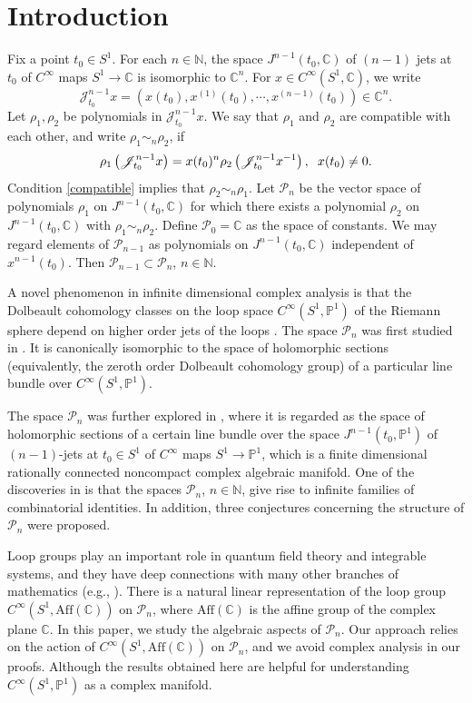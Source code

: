 \documentclass[11pt]{amsart}
\numberwithin{equation}{section}
\newcommand{\di}{\displaystyle}
\newcommand{\bc}{\mathbb{C}}
\newcommand{\bn}{\mathbb{N}}
\newcommand{\bp}{\mathbb{P}}
\newcommand{\scp}{\mathscr{P}}
\newcommand{\jnmpo}{J^{n-1}\left(t_0, \mathbb{P}^1\right)}
\newcommand{\jnmc}{J^{n-1}\left(t_0, \mathbb{C}\right)}
\newcommand{\sjm}{\mathscr{J}^{n-1}_{t_0}}
\newcommand{\sjmx}{\mathscr{J}^{n-1}_{t_0} x}
\newcommand{\cisoc}{C^{\infty}\left(S^1, \mathbb{C} \right)}
\newcommand{\pn}{\mathscr{P}_{n}}
\newcommand{\aff}{\mathrm{Aff}(\mathbb{C})}
\begin{document}
\section{Introduction \label{intro}}

Fix a point \(t_0 \in S^1\). For each \(n \in \bn\), the space \(\jnmc\) of \((n-1)\) jets at \(t_0\) of \(C^\infty\) maps \(S^1 \to \bc\) is isomorphic to \(\bc^n\). For \(x \in \cisoc\), we write
\[
\sjmx=(x(t_0), x^{(1)}(t_0), \cdots, x^{(n-1)}(t_0)) \in \bc^{n}.
\]
Let \(\rho_1, \rho_2\) be polynomials in $\sjmx$. We say that \(\rho_1\) and \(\rho_2\) are compatible with each other, and write \(\rho_1 \sim_n \rho_2\), if
\begin{equation} \label{compatible}
\rho_1\left( \sjmx \right)=x(t_0)^n \rho_2\left( \sjm x^{-1} \right), \hspace{2mm} x(t_0)\neq 0.
\end{equation}
Condition \eqref{compatible} implies that \(\rho_2 \sim_n \rho_1\).
Let \(\pn\) be the vector space of polynomials \(\rho_1\) on \(\jnmc\) for which there exists a polynomial \(\rho_2\) on \(\jnmc\) with \(\rho_1 \sim_n \rho_2\). Define \(\scp_0=\bc\) as the space of constants. We may regard elements of \(\scp_{n-1}\) as polynomials on \(\jnmc\) independent of \(\di x^{n-1}(t_0)\). Then \(\scp_{n-1} \subset \pn\), $n \in \bn$.

A novel phenomenon in infinite dimensional complex analysis is that the Dolbeault cohomology classes on the loop space $C^{\infty}(S^1,\bp^1)$ of the Riemann sphere depend on higher order jets of the loops \cite{z03,lz}. The space $\pn$ was first studied in \cite[Section~4]{z03}. It is canonically isomorphic to the space of holomorphic sections (equivalently, the zeroth order Dolbeault cohomology group) of a particular line bundle over $C^{\infty}(S^1,\bp^1)$.

The space $\pn$ was further explored in \cite{wz}, where it is regarded as the space of holomorphic sections of a certain line bundle over the space $\jnmpo$ of $(n-1)$-jets at $t_0\in S^1$ of $C^{\infty}$ maps $S^1\to\bp^1$, which is a finite dimensional rationally connected noncompact complex algebraic manifold. One of the discoveries in \cite{wz} is that the spaces $\pn$, $n\in\bn$, give rise to infinite families of combinatorial identities. In addition, three conjectures concerning the structure of $\pn$ were proposed.

Loop groups play an important role in quantum field theory and integrable systems, and they have deep connections with many other branches of mathematics (e.g., \cite{cl,f, g,hsw,ps}).
There is a natural linear representation of the loop group $C^{\infty}(S^1, \aff)$ on $\pn$, where $\aff$ is the affine group of the complex plane $\bc$. In this paper, we study the algebraic aspects of $\pn$. Our approach relies on the action of $C^{\infty}(S^1, \aff)$ on $\pn$, and we avoid complex analysis in our proofs.
Although the results obtained here are helpful for understanding $C^{\infty}(S^1,\bp^1)$ as a complex manifold.
\end{document}
